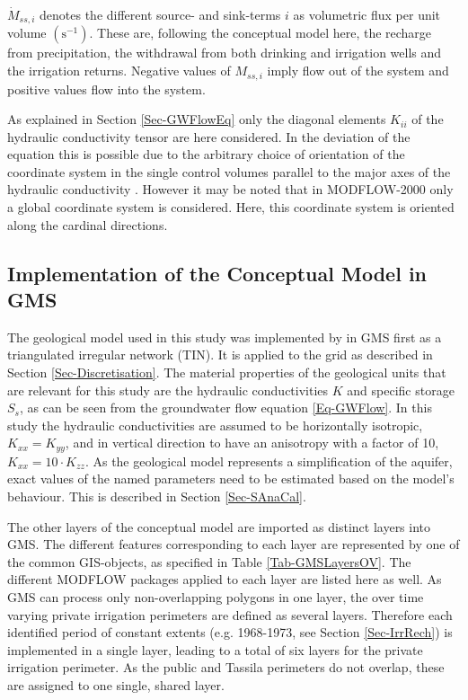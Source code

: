 $\dot{M}_{ss,i}$ denotes the different source- and sink-terms $i$ as volumetric flux per unit volume $\left( \textrm{s}^{-1} \right)$. 
These are, following the conceptual model here, the recharge from precipitation, the withdrawal from both drinking and irrigation wells and the irrigation returns. 
Negative values of $M_{ss,i}$ imply flow out of the system and positive values flow into the system.

As explained in Section \ref{Sec-GWFlowEq} only the diagonal elements $K_{ii}$ of the hydraulic conductivity tensor are here considered. 
In the deviation of the equation this is possible due to the arbitrary choice of orientation of the coordinate system in the single control volumes parallel to the major axes of the hydraulic conductivity \parencite{Harbaugh.2000}. 
However it may be noted that in MODFLOW-2000 only a global coordinate system is considered. 
Here, this coordinate system is oriented along the cardinal directions.


\subsection{Implementation of the Conceptual Model in GMS}
\label{Sec-ImplToGMS}

The geological model used in this study was implemented by \textcite{Horn.2021} in GMS first as a triangulated irregular network (TIN). 
It is applied to the grid as described in Section \ref{Sec-Discretisation}. 
The material properties of the geological units that are relevant for this study are the hydraulic conductivities $K$ and specific storage $S_s$, as can be seen from the groundwater flow equation \eqref{Eq-GWFlow}. 
In this study the hydraulic conductivities are assumed to be horizontally isotropic, $K_{xx} = K_{yy}$, and in vertical direction to have an anisotropy with a factor of 10, $K_{xx} = 10 \cdot K_{zz}$. 
As the geological model represents a simplification of the aquifer, exact values of the named parameters need to be estimated based on the model's behaviour. 
This is described in Section \ref{Sec-SAnaCal}.

The other layers of the conceptual model are imported as distinct layers into GMS. 
The different features corresponding to each layer are represented by one of the common GIS-objects, as specified in Table \ref{Tab-GMSLayersOV}. 
The different MODFLOW packages applied to each layer are listed here as well. 
As GMS can process only non-overlapping polygons in one layer, the over time varying private irrigation perimeters are defined as several layers. 
Therefore each identified period of constant extents (e.g. 1968-1973, see Section \ref{Sec-IrrRech}) is implemented in a single layer, leading to a total of six layers for the private irrigation perimeter. 
As the public and Tassila perimeters do not overlap, these are assigned to one single, shared layer.


